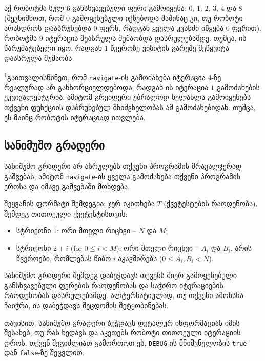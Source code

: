 \documentclass[12pt]{article}
\begin{document}
აქ რობოტმა სულ $6$ განსხვავებული ფერი გამოიყენა: $0$, $1$, $2$, $3$, $4$ და $8$ (შევნიშნოთ, რომ $0$ გამოყენებული იქნებოდა მაშინაც კი, თუ რობოტი არასდროს დააბრუნებდა $0$ ფერს, რადგან ყველა კვანძი იწყება $0$ ფერით). რობოტმა $9$ იტერაცია შეასრულა მუშაობდა დასრულებამდე. თუმცა, ის წარუმატებელი იყო, რადგან $1$ წვეროზე ვიზიტის გარეშე შეწყვიტა დაასრულა მუშაობა.

\textsuperscript{1}გაითვალისწინეთ, რომ \texttt{navigate}-ის გამოძახება იტერაცია $4$-ზე რეალურად არ განხორციელდებოდა, რადგან ის იტერაცია $1$ გამოძახების ეკვივალენტურია, ამიტომ გრეიდერი უბრალოდ ხელახლა გამოიყენებს თქვენი ფუნქციის დაბრუნებულ მნიშვნელობას ამ გამოძახებიდან. თუმცა, ეს მაინც რობოტის იტერაციად ითვლება.

\subsection{სანიმუშო გრადერი}

სანიმუშო გრადერი არ ასრულებს თქვენი პროგრამის მრავალჯერად გაშვებას, ამიტომ \texttt{navigate}-ის ყველა გამოძახება თქვენი პროგრამის ერთსა და იმავე გაშვებაში მოხდება.

შეყვანის ფორმატი შემდეგია: ჯერ იკითხება $T$ (ქვეტესტების რაოდენობა). შემდეგ თითოეული ქვეტესტისთვის:
\begin{itemize}
\item სტრიქონი  $1$: ორი მთელი რიცხვი -- $N$ და $M$;
\item სტრიქონი $2+i$ (for $0 \leq i < M$): ორი მთელი რიცხვი -- $A_i$ და $B_i$, არის წვეროები, რომლებას წიბო $i$ აკავშირებს ($0 \leq A_i, B_i < N$).
\end{itemize}

სანიმუშო გრადერი შემდეგ დაბეჭდავს თქვენს მიერ გამოყენებული განსხვავებული ფერების რაოდენობას და საჭირო იტერაციების რაოდენობას დასრულებამდე. ალტერნატიულად, თუ თქვენი ამოხსნა ჩაიჭრა, ის დაბეჭდავს შეცდომის შეტყობინებას.

თავისით, სანიმუშო გრადერი ბეჭდავს დეტალურ ინფორმაციას იმის შესახებ, თუ რას ხედავს და აკეთებს რობოტი თითოეული იტერაციის დროს. თქვენ შეგიძლიათ გამორთოთ ეს, \texttt{DEBUG}-ის მნიშვნელობის \texttt{true}-დან \texttt{false}-ზე შეცვლით.
\end{document}
